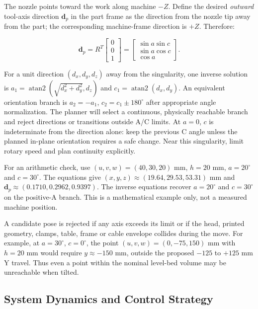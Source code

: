 \documentclass[12pt,a4paper]{article}
\begin{document}
The nozzle points toward the work along machine \(-Z\). Define the desired \emph{outward} tool-axis
  direction \(\mathbf{d}_p\) in the part frame as the direction from the nozzle tip away from the part;
  the corresponding machine-frame direction is \(+Z\). Therefore:

\[
\mathbf{d}_p=R^T\begin{bmatrix}0\\0\\1\end{bmatrix}
=\begin{bmatrix}\sin a\sin c\\\sin a\cos c\\\cos a\end{bmatrix}.
\]

For a unit direction \((d_x,d_y,d_z)\) away from the singularity, one inverse solution is
  \(a_1=\operatorname{atan2}(\sqrt{d_x^2+d_y^2},d_z)\) and \(c_1=\operatorname{atan2}(d_x,d_y)\). An
  equivalent orientation branch is \(a_2=-a_1\), \(c_2=c_1\pm180^\circ\) after appropriate angle
  normalization. The planner will select a continuous, physically reachable branch and reject directions
  or transitions outside A/C limits. At \(a=0\), \(c\) is indeterminate from the direction alone: keep
  the previous C angle unless the planned in-plane orientation requires a safe change. Near this
  singularity, limit rotary speed and plan continuity explicitly.

For an arithmetic check, use \((u,v,w)=(40,30,20)\) mm, \(h=20\) mm, \(a=20^\circ\) and \(c=30^\circ\).
  The equations give \((x,y,z)\approx(19.64,29.53,53.31)\) mm and
  \(\mathbf{d}_p\approx(0.1710,0.2962,0.9397)\). The inverse equations recover \(a=20^\circ\) and
  \(c=30^\circ\) on the positive-A branch. This is a mathematical example only, not a measured machine
  position.

A candidate pose is rejected if any axis exceeds its limit or if the head, printed geometry, clamps,
  table, frame or cable envelope collides during the move. For example, at \(a=30^\circ\), \(c=0^\circ\),
  the point \((u,v,w)=(0,-75,150)\) mm with \(h=20\) mm would require \(y\approx-150\) mm, outside the
  proposed \(-125\) to \(+125\) mm Y travel. Thus even a point within the nominal level-bed volume may be
  unreachable when tilted.

\subsection{System Dynamics and Control Strategy}\label{system-dynamics-and-control-strategy}
\end{document}
